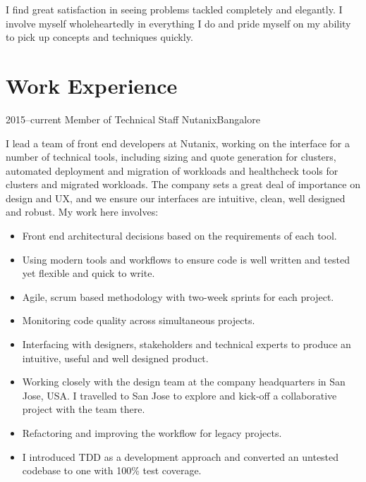 \documentclass[11pt,a4paper,sans]{moderncv}        %
\begin{document}
\makecvtitle

\small{I find great satisfaction in seeing problems tackled completely and elegantly. I involve myself wholeheartedly in everything I do and pride myself on my ability to pick up concepts and techniques quickly.}

\vspace{6pt}

\section{Work Experience}

\vspace{6pt}

\cventry
{\textcolor{light}{2015--current}}
{Member of Technical Staff}
{}
{Nutanix}{Bangalore}
{I lead a team of front end developers at Nutanix, working on the interface for a number of technical tools, including sizing and quote generation for clusters, automated deployment and migration of workloads and healthcheck tools for clusters and migrated workloads. The company sets a great deal of importance on design and UX, and we ensure our interfaces are intuitive, clean, well designed and robust. My work here involves:
\vspace{6pt}
\begin{itemize}
  \item Front end architectural decisions based on the requirements of each tool.
  \item Using modern tools and workflows to ensure code is well written and tested yet flexible and quick to write.
  \item Agile, scrum based methodology with two-week sprints for each project.
  \item Monitoring code quality across simultaneous projects.
  \item Interfacing with designers, stakeholders and technical experts to produce an intuitive, useful and well designed product.
  \item Working closely with the design team at the company headquarters in San Jose, USA. I travelled to San Jose to explore and kick-off a collaborative project with the team there.
  \item Refactoring and improving the workflow for legacy projects.
  \item I introduced TDD as a development approach and converted an untested codebase to one with 100\% test coverage.
\end{itemize}}
\end{document}
